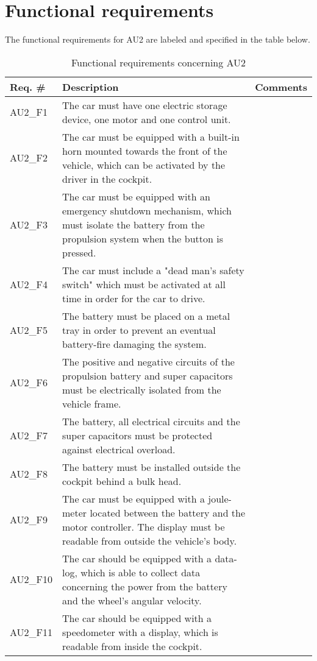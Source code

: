 \section{Functional requirements}
The functional requirements for AU2 are labeled and specified in the table below.

\begin{table}[h!]
	\label{FREQ_AU2}
	\centering
	\begin{tabular}{|p{2 cm}|p{7 cm}|p{4 cm}|}
		\hline
		\textbf{Req. \#} & \textbf{Description} & \textbf{Comments} \\\hline
		AU2\_F1		& The car must have one electric storage device, one motor and one control unit. &   \\\hline
		AU2\_F2		& The car must be equipped with a built-in horn mounted towards the front of the vehicle, which can be activated by the driver in the cockpit. &   \\\hline
		AU2\_F3		& The car must be equipped with an emergency shutdown mechanism, which must isolate the battery from the propulsion system when the button is pressed. &   \\\hline
		AU2\_F4		& The car must include a "dead man's safety switch" which must be activated at all time in order for the car to drive. &   \\\hline
		AU2\_F5		& The battery must be placed on a metal tray in order to prevent an eventual battery-fire damaging the system. &   \\\hline
		AU2\_F6		& The positive and negative circuits of the propulsion battery and super capacitors must be electrically isolated from the vehicle frame. &   \\\hline
		AU2\_F7		& The battery, all electrical circuits and the super capacitors must be protected against electrical overload. &   \\\hline
		AU2\_F8		& The battery must be installed outside the cockpit behind a bulk head. &   \\\hline
		AU2\_F9		& The car must be equipped with a joule-meter located between the battery and the motor controller. The display must be readable from outside the vehicle's body. &   \\\hline
		AU2\_F10	& The car should be equipped with a data-log, which is able to collect data concerning the power from the battery and the wheel's angular velocity. &   \\\hline
		AU2\_F11	& The car should be equipped with a speedometer with a display, which is readable from inside the cockpit. &   \\\hline
	\end{tabular}
	\caption{Functional requirements concerning AU2}
\end{table}